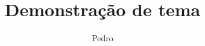 \documentclass{beamer}
\title{Demonstração de tema}
\author{Pedro}
\begin{document}
\begin{frame}
\titlepage
\end{frame}
\end{document}
